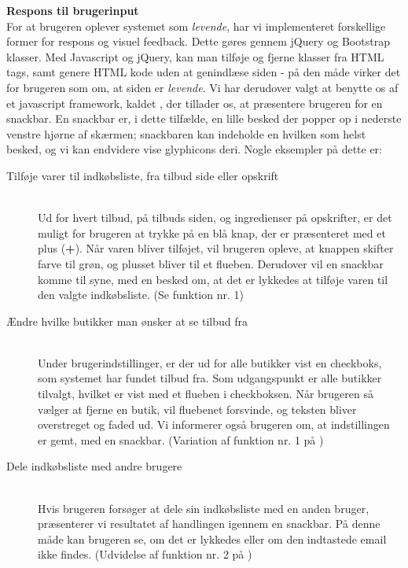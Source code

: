 \textbf{Respons til brugerinput}\hfill\\
For at brugeren oplever systemet som \textit{levende}, har vi implementeret forskellige former for respons og visuel feedback.
Dette gøres gennem jQuery og Bootstrap klasser.
Med Javascript og jQuery, kan man tilføje og fjerne klasser fra HTML tags, samt genere HTML kode uden at genindlæse siden - på den måde virker det for brugeren som om, at siden er \textit{levende}.
Vi har derudover valgt at benytte os af et javascript framework, kaldet , der tillader os, at præsentere brugeren for en snackbar.
En snackbar er, i dette tilfælde, en lille besked der popper op i nederste venstre hjørne af skærmen; snackbaren kan indeholde en hvilken som helst besked, og vi kan endvidere vise glyphicons deri.
Nogle eksempler på dette er:
\begin{description}
\item[Tilføje varer til indkøbsliste, fra tilbud side eller opskrift]\hfill\\
Ud for hvert tilbud, på tilbuds siden, og ingredienser på opskrifter, er det muligt for brugeren at trykke på en blå knap, der er præsenteret med et plus (\textbf{+}). 
Når varen bliver tilføjet, vil brugeren opleve, at knappen skifter farve til grøn, og plusset bliver til et flueben.
Derudover vil en snackbar komme til syne, med en besked om, at det er lykkedes at tilføje varen til den valgte indkøbsliste.
(Se  funktion nr. 1)
\item[Ændre hvilke butikker man ønsker at se tilbud fra]\hfill\\
Under brugerindstillinger, er der ud for alle butikker vist en checkboks, som systemet har fundet tilbud fra.
Som udgangspunkt er alle butikker tilvalgt, hvilket er vist med et flueben i checkboksen.
Når brugeren så vælger at fjerne en butik, vil fluebenet forsvinde, og teksten bliver overstreget og faded ud.
Vi informerer også brugeren om, at indstillingen er gemt, med en snackbar.
(Variation af funktion nr. 1 på )
\item[Dele indkøbsliste med andre brugere]\hfill\\
Hvis brugeren forsøger at dele sin indkøbsliste med en anden bruger, præsenterer vi resultatet af handlingen igennem en snackbar.
På denne måde kan brugeren se, om det er lykkedes eller om den indtastede email ikke findes.
(Udvidelse af funktion nr. 2 på )
\end{description}

